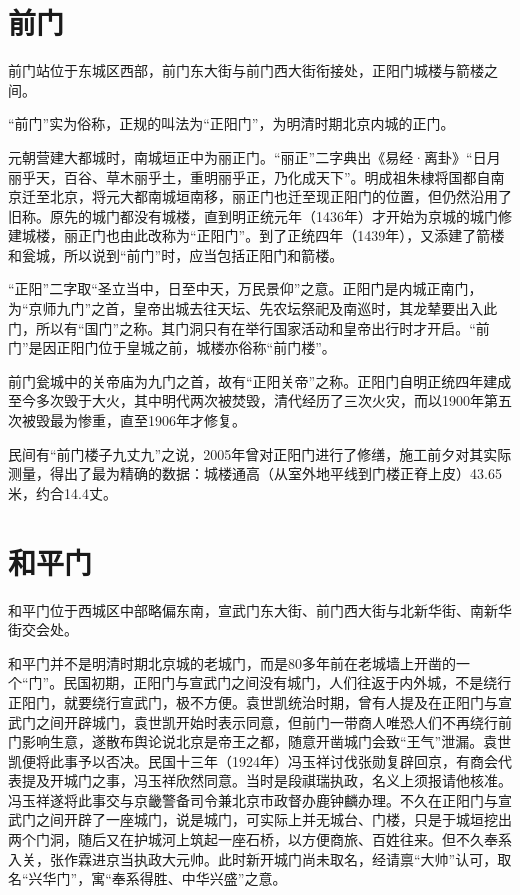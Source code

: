 \section{前门}
前门站位于东城区西部，前门东大街与前门西大街衔接处，正阳门城楼与箭楼之间。

“前门”实为俗称，正规的叫法为“正阳门”，为明清时期北京内城的正门。

元朝营建大都城时，南城垣正中为丽正门。“丽正”二字典出《易经·离卦》“日月丽乎天，百谷、草木丽乎土，重明丽乎正，乃化成天下”。明成祖朱棣将国都自南京迁至北京，将元大都南城垣南移，丽正门也迁至现正阳门的位置，但仍然沿用了旧称。原先的城门都没有城楼，直到明正统元年（1436年）才开始为京城的城门修建城楼，丽正门也由此改称为“正阳门”。到了正统四年（1439年），又添建了箭楼和瓮城，所以说到“前门”时，应当包括正阳门和箭楼。

“正阳”二字取“圣立当中，日至中天，万民景仰”之意。正阳门是内城正南门，为“京师九门”之首，皇帝出城去往天坛、先农坛祭祀及南巡时，其龙辇要出入此门，所以有“国门”之称。其门洞只有在举行国家活动和皇帝出行时才开启。“前门”是因正阳门位于皇城之前，城楼亦俗称“前门楼”。

前门瓮城中的关帝庙为九门之首，故有“正阳关帝”之称。正阳门自明正统四年建成至今多次毁于大火，其中明代两次被焚毁，清代经历了三次火灾，而以1900年第五次被毁最为惨重，直至1906年才修复。

民间有“前门楼子九丈九”之说，2005年曾对正阳门进行了修缮，施工前夕对其实际测量，得出了最为精确的数据：城楼通高（从室外地平线到门楼正脊上皮）43.65米，约合14.4丈。

\section{和平门}
和平门位于西城区中部略偏东南，宣武门东大街、前门西大街与北新华街、南新华街交会处。

和平门并不是明清时期北京城的老城门，而是80多年前在老城墙上开凿的一个“门”。民国初期，正阳门与宣武门之间没有城门，人们往返于内外城，不是绕行正阳门，就要绕行宣武门，极不方便。袁世凯统治时期，曾有人提及在正阳门与宣武门之间开辟城门，袁世凯开始时表示同意，但前门一带商人唯恐人们不再绕行前门影响生意，遂散布舆论说北京是帝王之都，随意开凿城门会致“王气”泄漏。袁世凯便将此事予以否决。民国十三年（1924年）冯玉祥讨伐张勋复辟回京，有商会代表提及开城门之事，冯玉祥欣然同意。当时是段祺瑞执政，名义上须报请他核准。冯玉祥遂将此事交与京畿警备司令兼北京市政督办鹿钟麟办理。不久在正阳门与宣武门之间开辟了一座城门，说是城门，可实际上并无城台、门楼，只是于城垣挖出两个门洞，随后又在护城河上筑起一座石桥，以方便商旅、百姓往来。但不久奉系入关，张作霖进京当执政大元帅。此时新开城门尚未取名，经请禀“大帅”认可，取名“兴华门”，寓“奉系得胜、中华兴盛”之意。

